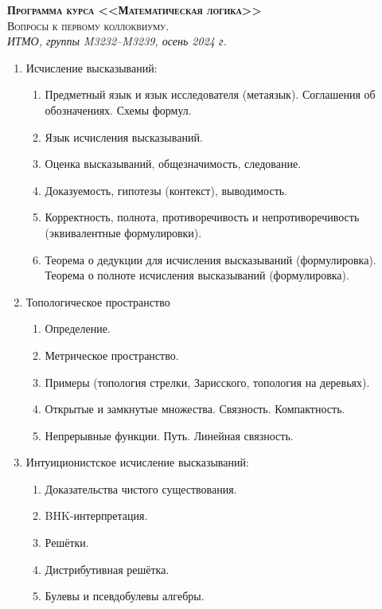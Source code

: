 \documentclass[11pt,a4paper,oneside]{scrartcl}
\begin{document}
\pagestyle{empty}

\begin{center}
{\large\scshape\bfseries Программа курса <<Математическая логика>>}\\
{\large\scshape Вопросы к первому коллоквиуму.}\\
\itshape ИТМО, группы M3232--M3239, осень 2024 г.
\end{center}


\begin{enumerate}
\item Исчисление высказываний:
\begin{enumerate}
\item Предметный язык и язык исследователя (метаязык). Соглашения об обозначениях. Схемы формул.
\item Язык исчисления высказываний.
\item Оценка высказываний, общезначимость, следование.
\item Доказуемость, гипотезы (контекст), выводимость.
\item Корректность, полнота, противоречивость и непротиворечивость (эквивалентные формулировки).
\item Теорема о дедукции для исчисления высказываний (формулировка). Теорема о полноте исчисления высказываний (формулировка).
\end{enumerate}
\item Топологическое пространство
\begin{enumerate}
\item Определение.
\item Метрическое пространство.
\item Примеры (топология стрелки, Зарисского, топология на деревьях). 
\item Открытые и замкнутые множества. Связность. Компактность. 
\item Непрерывные функции. Путь. Линейная связность. 
\end{enumerate}
\item Интуиционистское исчисление высказываний:
\begin{enumerate}
\item Доказательства чистого существования.
\item BHK-интерпретация. 
\item Решётки. 
\item Дистрибутивная решётка.
\item Булевы и псевдобулевы алгебры.

\end{enumerate}
\end{enumerate}
\end{document}

